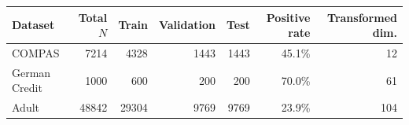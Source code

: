 \begin{tabular}{lrrrrrr}
\hline
Dataset & Total $N$ & Train & Validation & Test & Positive rate & Transformed dim. \\
\hline
COMPAS & 7214 & 4328 & 1443 & 1443 & 45.1\% & 12 \\
German Credit & 1000 & 600 & 200 & 200 & 70.0\% & 61 \\
Adult & 48842 & 29304 & 9769 & 9769 & 23.9\% & 104 \\
\hline
\end{tabular}